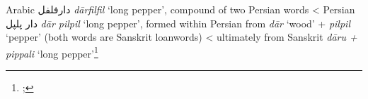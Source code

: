 \begin{etymology}\label{ety:darfilfil}
Arabic {دارفلفل} \textit{dārfilfil} `long pepper', compound of two Persian words
< Persian {دار پلپل‎} \textit{dār pilpil} `long pepper', formed within Persian from \textit{dār} `wood' + \textit{pilpil} `pepper' (both words are Sanskrit loanwords)
< ultimately from Sanskrit \textit{dāru + pippali} `long pepper'\footnote{\textcite[2435]{lane_arabic-english_1863}; }
\end{etymology}